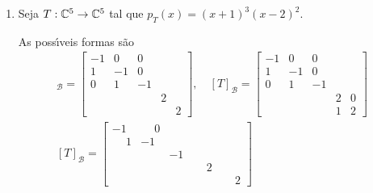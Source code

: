 \begin{exemplo}
\begin{enumerate}
\begin{solucao}
			Se $r = 1$, ent\~ao
			\[
				[T_2]_{\mathcal{B}_2} = \left[\begin{tabular}{ccc}
 					3 & 0 & 0\\
 					0 & 3 & 0\\
 					0 & 0 & 3
				\end{tabular}
				\right].
			\]
			Se $r = 2$, ent\~ao
			\[
				[T_1]_{\mathcal{B}_1} = \left[\begin{tabular}{cc|c}
 					3 & 0 & \\
 					1 & 3 & \\ \cline{1-3}
 					&  & 3
 				\end{tabular}
				\right].
			\]
			Se $r = 3$, ent\~ao
			\[
				[T_1]_{\mathcal{B}_1} = \left[\begin{tabular}{ccc}
 						3 & 0 & 0 \\
 						1 & 3 & 0 \\
 						0 & 1 & 3
					\end{tabular}
				\right].
			\]
			Logo existem 15 poss{\'\i}veis formas de Jordan para $T$.
		\end{solucao}
		\item Seja $T : \mathbb{C}^5 \to \mathbb{C}^5$ tal que $p_T(x) = (x + 1)^3(x - 2)^2$.
		\begin{solucao}
			As poss{\'\i}veis formas s\~ao
			\begin{align*}
				[T]_\mathcal{B} = \begin{bmatrix}
					-1 & 0 & 0 & &\\
					1 & -1 & 0 & & \\
					0 & 1 & -1 & &\\
					& & & 2 & \\
					& & & & 2
				\end{bmatrix}, \quad [T]_\mathcal{B} = \begin{bmatrix}
					-1 & 0 & 0 & &\\
					1 & -1 & 0 & & \\
					0 & 1 & -1 & &\\
					& & & 2 & 0\\
					& & & 1 & 2
				\end{bmatrix}\\
				[T]_\mathcal{B} = \begin{bmatrix}
					-1 & \phantom{-}0 & & &\\
					\phantom{-}1 & -1 & & & \\
					 &  & -1 & &\\
					& & & \phantom{-}2 & \\
					& & & & \phantom{-}2

\end{bmatrix}
\end{align*}
\end{solucao}
\end{enumerate}
\end{exemplo}
